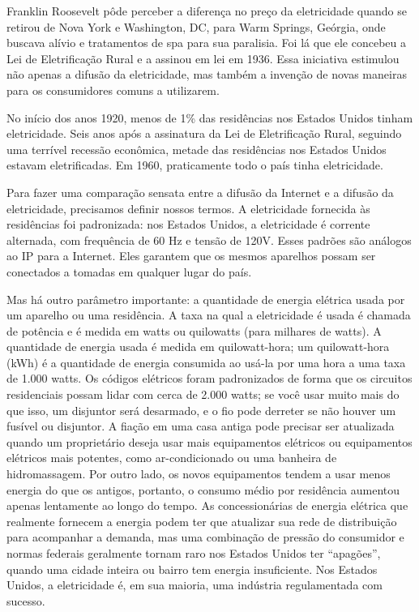 Franklin Roosevelt pôde perceber a diferença no preço da eletricidade quando se retirou de Nova
York e Washington, DC, para Warm Springs, Geórgia, onde buscava alívio e tratamentos de spa para
sua paralisia. Foi lá que ele concebeu a Lei de Eletrificação Rural e a assinou em lei em 1936.
Essa iniciativa estimulou não apenas a difusão da eletricidade, mas também a invenção de novas
maneiras para os consumidores comuns a utilizarem.

No início dos anos 1920, menos de 1\% das residências nos Estados Unidos tinham eletricidade. Seis
anos após a assinatura da Lei de Eletrificação Rural, seguindo uma terrível recessão econômica,
metade das residências nos Estados Unidos estavam eletrificadas. Em 1960, praticamente todo o país
tinha eletricidade.

Para fazer uma comparação sensata entre a difusão da Internet e a difusão da eletricidade,
precisamos definir nossos termos. A eletricidade fornecida às residências foi padronizada: nos
Estados Unidos, a eletricidade é corrente alternada, com frequência de 60 Hz e tensão de 120V.
Esses padrões são análogos ao IP para a Internet. Eles garantem que os mesmos aparelhos possam
ser conectados a tomadas em qualquer lugar do país.

Mas há outro parâmetro importante: a quantidade de energia elétrica usada por um aparelho ou
uma residência. A taxa na qual a eletricidade é usada é chamada de potência e é medida em
watts ou quilowatts (para milhares de watts). A quantidade de energia usada é medida em
quilowatt-hora; um quilowatt-hora (kWh) é a quantidade de energia consumida ao usá-la por uma
hora a uma taxa de 1.000 watts. Os códigos elétricos foram padronizados de forma que os
circuitos residenciais possam lidar com cerca de 2.000 watts; se você usar muito mais do que
isso, um disjuntor será desarmado, e o fio pode derreter se não houver um fusível ou disjuntor.
A fiação em uma casa antiga pode precisar ser atualizada quando um proprietário deseja usar
mais equipamentos elétricos ou equipamentos elétricos mais potentes, como ar-condicionado ou
uma banheira de hidromassagem. Por outro lado, os novos equipamentos tendem a usar menos
energia do que os antigos, portanto, o consumo médio por residência aumentou apenas lentamente
ao longo do tempo. As concessionárias de energia elétrica que realmente fornecem a energia
podem ter que atualizar sua rede de distribuição para acompanhar a demanda, mas uma combinação
de pressão do consumidor e normas federais geralmente tornam raro nos Estados Unidos ter
``apagões'', quando uma cidade inteira ou bairro tem energia insuficiente. Nos Estados Unidos,
a eletricidade é, em sua maioria, uma indústria regulamentada com sucesso.

